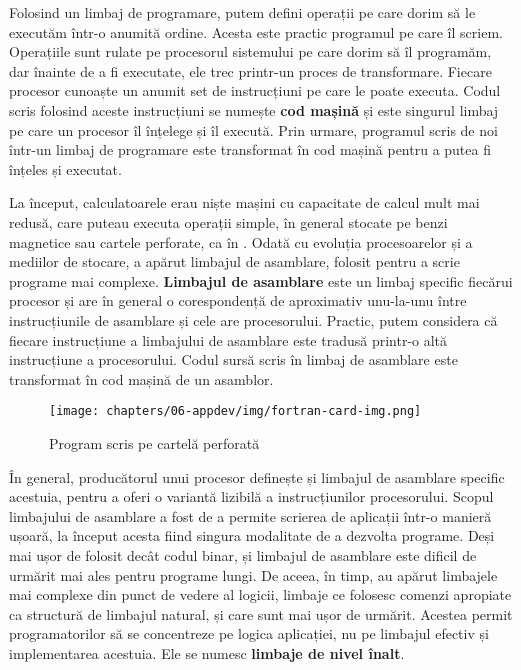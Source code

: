 Folosind un limbaj de programare, putem defini operații pe care dorim să le
executăm într-o anumită ordine. Acesta este practic programul pe care îl scriem.
Operațiile sunt rulate pe procesorul sistemului pe care dorim să îl programăm,
dar înainte de a fi executate, ele trec printr-un proces de transformare.
Fiecare procesor cunoaște un anumit set de instrucțiuni pe care le poate
executa. Codul scris folosind aceste instrucțiuni se numește \textbf{cod mașină} și este
singurul limbaj pe care un procesor îl înțelege și îl execută. Prin urmare,
programul scris de noi într-un limbaj de programare este transformat în cod
mașină pentru a putea fi înțeles și executat.

La început, calculatoarele erau niște mașini cu capacitate de calcul mult mai
redusă, care puteau executa operații simple, în general stocate pe benzi
magnetice sau cartele perforate, ca în . Odată cu evoluția procesoarelor și a mediilor de
stocare, a apărut limbajul de asamblare, folosit pentru a scrie programe mai
complexe. \textbf{Limbajul de asamblare} este un limbaj specific fiecărui procesor și are
în general o corespondență de aproximativ unu-la-unu între instrucțiunile de
asamblare și cele are procesorului. Practic, putem considera că fiecare
instrucțiune a limbajului de asamblare este tradusă printr-o altă instrucțiune a
procesorului. Codul sursă scris în limbaj de asamblare este transformat în cod
mașină de un asamblor.

\begin{figure}[!htbp]
  \centering
  \texttt{[image: chapters/06-appdev/img/fortran-card-img.png]}
  \caption{Program scris pe cartelă perforată\protect\footnotemark}
  \label{fig:appdev:card}
\end{figure}


În general, producătorul unui procesor definește și limbajul de asamblare
specific acestuia, pentru a oferi o variantă lizibilă a instrucțiunilor
procesorului. Scopul limbajului de asamblare a fost de a permite scrierea de
aplicații într-o manieră ușoară, la început acesta fiind singura modalitate de
a dezvolta programe. Deși mai ușor de folosit decât codul binar, și limbajul de
asamblare este dificil de urmărit mai ales pentru programe lungi. De aceea, în
timp, au apărut limbajele mai complexe din punct de vedere al logicii, limbaje
ce folosesc comenzi apropiate ca structură de limbajul natural, și care sunt mai
ușor de urmărit. Acestea permit programatorilor să se concentreze pe logica
aplicației, nu pe limbajul efectiv și implementarea acestuia. Ele se numesc
\textbf{limbaje de nivel înalt}.

